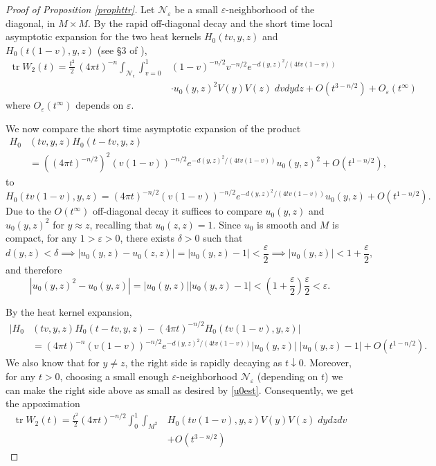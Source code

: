 \documentclass[letterpaper,12pt]{amsart}
\newcommand{\eps}{\varepsilon}
\def \eref{\eqref}
\newcommand{\tr}{\mathop{\mathrm{tr}}}
\newcommand{\cN}{\mathcal{N}}
\begin{document}
\begin{proof}[Proof of Proposition \ref{prophttr}]
Let $\cN_\eps$ be a small $\eps$-neighborhood of the diagonal,  in $M \times M$.
By the rapid off-diagonal decay and the short time local asymptotic expansion for the two heat kernels $H_0 (tv, y, z)$ and $H_0 (t(1-v), y, z)$ (see \S 3 of \cite{Ro}),
\begin{equation*}
\begin{split}
\tr W_2 (t) = \frac{t^2}{2} \, (4\pi t)^{-n} \int_{\cN_\epsilon} \int_{v=0} ^1 &(1-v)^{-n/2} v^{-n/2} e^{-d(y,z)^2/(4tv(1-v))} \\
& \cdot u_0 (y, z)^2 V(y) V(z) \;dv dy dz  + O(t^{3-n/2}) + O_\eps(t^\infty)
\end{split}
\end{equation*}
where $O_\eps(t^\infty)$ depends on $\eps$.

We now compare the short time asymptotic expansion of the product
\begin{equation*}
\begin{split}
H_0 &(tv, y, z) H_0 (t - tv, y, z) \\
&= \left( (4\pi t)^{-n/2} \right)^2 (v(1-v))^{-n/2} e^{-d(y,z)^2/(4tv(1-v))} u_0(y,z)^2 + O(t^{1-n/2}),
\end{split}
\end{equation*}
to
$$H_0(tv(1-v), y, z) =  (4\pi t)^{-n/2} (v(1-v))^{-n/2} e^{-d(y,z)^2/(4tv(1-v))} u_0 (y,z) + O(t^{1-n/2}).$$
Due to the $O(t^\infty)$ off-diagonal decay it suffices to compare $u_0 (y,z)$ and $u_0 (y,z)^2$ for $y \approx z$, recalling that $u_0(z,z)=1$. Since $u_0$ is smooth and $M$ is compact, for any $1>\eps > 0$, there exists $\delta > 0$ such that
$$d(y,z) < \delta \implies |u_0 (y,z) - u_0 (z,z)| = |u_0 (y,z) - 1| < \frac{\eps}{2} \implies |u_0(y,z)| < 1+ \frac{\eps }{2},$$
and therefore
\begin{equation} \label{u0est}
|u_0 (y,z)^2 - u_0 (y,z)| = |u_0 (y,z)| | u_0 (y,z) - 1|  < \left( 1+ \frac{\eps}{2} \right) \frac{ \eps  }{2} < \eps.
\end{equation}

By the heat kernel expansion,
\begin{equation*}
\begin{split}
|H_0 &(tv, y, z) H_0 (t - tv, y, z) - (4\pi t ) ^{-n/2} H_0 (tv(1-v),y,z) |\\
&= (4\pi t)^{-n} (v(1-v))^{-n/2} e^{-d(y,z)^2/(4tv(1-v))} |u_0(y,z)|\; |u_0 (y,z) - 1| +O(t^{1-n/2}).
\end{split}
\end{equation*}
We also know that for $y \neq z$, the right side is rapidly decaying as $t \downarrow 0$.  Moreover, for any $t>0$, choosing a small enough $\eps$-neighborhood $\cN_\eps$ (depending on $t$) we can make the right side above as small as desired by \eref{u0est}.  Consequently, we get the appoximation
\begin{equation} \label{W_2e5}
\begin{split}
\tr W_2 (t) = \frac{t^2}{2} (4\pi t)^{-n/2} \int_0 ^1 \int_{M^2} & H_0 (tv(1-v), y, z) V(y) V(z) \;dy dz dv \\
&+ O(t^{3-n/2})
\end{split}
\end{equation}



\end{proof}
\end{document}
